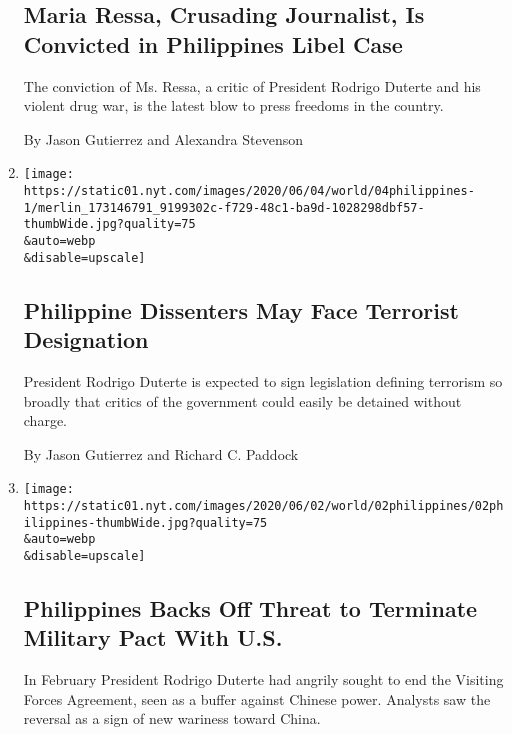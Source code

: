 \begin{enumerate}
{  \subsection{Maria Ressa, Crusading Journalist, Is Convicted in
  Philippines Libel
  Case}\label{maria-ressa-crusading-journalist-is-convicted-in-philippines-libel-case}}

  The conviction of Ms. Ressa, a critic of President Rodrigo Duterte and
  his violent drug war, is the latest blow to press freedoms in the
  country.

  By Jason Gutierrez and Alexandra Stevenson
\item
  \href{/2020/06/04/world/asia/duterte-philippines-terrorism-drug.html}{}

  \texttt{[image: https://static01.nyt.com/images/2020/06/04/world/04philippines-1/merlin\_173146791\_9199302c-f729-48c1-ba9d-1028298dbf57-thumbWide.jpg?quality=75\\\&auto=webp\\\&disable=upscale]}

  \hypertarget{philippine-dissenters-may-face-terrorist-designation}{%
  \subsection{Philippine Dissenters May Face Terrorist
  Designation}\label{philippine-dissenters-may-face-terrorist-designation}}

  President Rodrigo Duterte is expected to sign legislation defining
  terrorism so broadly that critics of the government could easily be
  detained without charge.

  By Jason Gutierrez and Richard C. Paddock
\item
  \href{/2020/06/02/world/asia/philippines-military-pact-us-duterte.html}{}

  \texttt{[image: https://static01.nyt.com/images/2020/06/02/world/02philippines/02philippines-thumbWide.jpg?quality=75\\\&auto=webp\\\&disable=upscale]}

  \hypertarget{philippines-backs-off-threat-to-terminate-military-pact-with-us}{%
  \subsection{Philippines Backs Off Threat to Terminate Military Pact
  With
  U.S.}\label{philippines-backs-off-threat-to-terminate-military-pact-with-us}}

  In February President Rodrigo Duterte had angrily sought to end the
  Visiting Forces Agreement, seen as a buffer against Chinese power.
  Analysts saw the reversal as a sign of new wariness toward China.


\end{enumerate}
